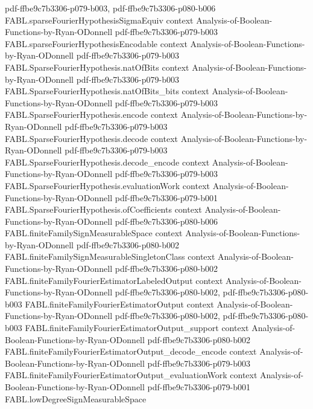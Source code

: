\begin{theorem}
  {pdf-ffbe9c7b3306-p079-b003,
    pdf-ffbe9c7b3306-p080-b006}
\proofstep
  {FABL.sparseFourierHypothesisSigmaEquiv}
  {context}
  {Analysis-of-Boolean-Functions-by-Ryan-ODonnell}
  {pdf-ffbe9c7b3306-p079-b003}
\proofstep
  {FABL.sparseFourierHypothesisEncodable}
  {context}
  {Analysis-of-Boolean-Functions-by-Ryan-ODonnell}
  {pdf-ffbe9c7b3306-p079-b003}
\proofstep
  {FABL.SparseFourierHypothesis.natOfBits}
  {context}
  {Analysis-of-Boolean-Functions-by-Ryan-ODonnell}
  {pdf-ffbe9c7b3306-p079-b003}
\proofstep
  {FABL.SparseFourierHypothesis.natOfBits_bits}
  {context}
  {Analysis-of-Boolean-Functions-by-Ryan-ODonnell}
  {pdf-ffbe9c7b3306-p079-b003}
\proofstep
  {FABL.SparseFourierHypothesis.encode}
  {context}
  {Analysis-of-Boolean-Functions-by-Ryan-ODonnell}
  {pdf-ffbe9c7b3306-p079-b003}
\proofstep
  {FABL.SparseFourierHypothesis.decode}
  {context}
  {Analysis-of-Boolean-Functions-by-Ryan-ODonnell}
  {pdf-ffbe9c7b3306-p079-b003}
\proofstep
  {FABL.SparseFourierHypothesis.decode_encode}
  {context}
  {Analysis-of-Boolean-Functions-by-Ryan-ODonnell}
  {pdf-ffbe9c7b3306-p079-b003}
\proofstep
  {FABL.SparseFourierHypothesis.evaluationWork}
  {context}
  {Analysis-of-Boolean-Functions-by-Ryan-ODonnell}
  {pdf-ffbe9c7b3306-p079-b001}
\proofstep
  {FABL.SparseFourierHypothesis.ofCoefficients}
  {context}
  {Analysis-of-Boolean-Functions-by-Ryan-ODonnell}
  {pdf-ffbe9c7b3306-p080-b006}
\proofstep
  {FABL.finiteFamilySignMeasurableSpace}
  {context}
  {Analysis-of-Boolean-Functions-by-Ryan-ODonnell}
  {pdf-ffbe9c7b3306-p080-b002}
\proofstep
  {FABL.finiteFamilySignMeasurableSingletonClass}
  {context}
  {Analysis-of-Boolean-Functions-by-Ryan-ODonnell}
  {pdf-ffbe9c7b3306-p080-b002}
\proofstep
  {FABL.finiteFamilyFourierEstimatorLabeledOutput}
  {context}
  {Analysis-of-Boolean-Functions-by-Ryan-ODonnell}
  {pdf-ffbe9c7b3306-p080-b002,
    pdf-ffbe9c7b3306-p080-b003}
\proofstep
  {FABL.finiteFamilyFourierEstimatorOutput}
  {context}
  {Analysis-of-Boolean-Functions-by-Ryan-ODonnell}
  {pdf-ffbe9c7b3306-p080-b002,
    pdf-ffbe9c7b3306-p080-b003}
\proofstep
  {FABL.finiteFamilyFourierEstimatorOutput_support}
  {context}
  {Analysis-of-Boolean-Functions-by-Ryan-ODonnell}
  {pdf-ffbe9c7b3306-p080-b002}
\proofstep
  {FABL.finiteFamilyFourierEstimatorOutput_decode_encode}
  {context}
  {Analysis-of-Boolean-Functions-by-Ryan-ODonnell}
  {pdf-ffbe9c7b3306-p079-b003}
\proofstep
  {FABL.finiteFamilyFourierEstimatorOutput_evaluationWork}
  {context}
  {Analysis-of-Boolean-Functions-by-Ryan-ODonnell}
  {pdf-ffbe9c7b3306-p079-b001}
\proofstep
  {FABL.lowDegreeSignMeasurableSpace}

\end{theorem}
